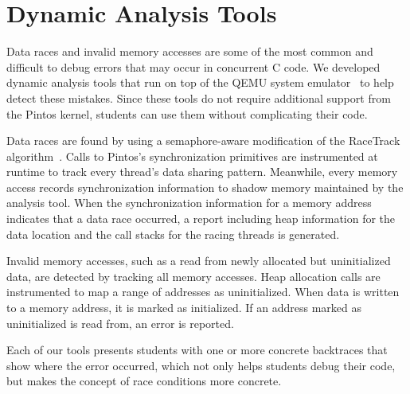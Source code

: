 \section{Dynamic Analysis Tools}
\label{sec:dynamicanalysis}

Data races and invalid memory accesses are some of the most common and
difficult to debug errors that may occur in concurrent C code.
We developed dynamic analysis tools that run on top of the QEMU
system emulator~\cite{Bellard2005QEMU} to help detect these mistakes. 
Since these tools do not require additional support from the Pintos kernel,
students can use them without complicating their code.

Data races are found by using a semaphore-aware modification of the RaceTrack algorithm~\cite{Yu2005RaceTrack}. 
Calls to Pintos's synchronization primitives are instrumented at runtime to track every thread's data
sharing pattern.  Meanwhile, every memory access records synchronization information to shadow memory
maintained by the analysis tool. When the synchronization information for a memory address
indicates that a data race occurred, a report including heap information for the data location and the
call stacks for the racing threads is generated.

Invalid memory accesses, such as a read from newly allocated but uninitialized data, are detected by
tracking all memory accesses.  Heap allocation calls are instrumented to map a range of addresses as
uninitialized. When data is written to a memory address, it is marked as initialized. If an address
marked as uninitialized is read from, an error is reported.

Each of our tools presents students with one or more concrete backtraces that
show where the error occurred, which not only helps students debug their code,
but makes the concept of race conditions more concrete.
